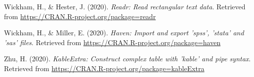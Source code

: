 \documentclass[
  english,
  doc,floatsintext]{apa6}
\newlength{\cslhangindent}
\newenvironment{cslreferences}%
  {\setlength{\parindent}{0pt}%
  \everypar{\setlength{\hangindent}{\cslhangindent}}\ignorespaces}%
  {\par}
\begin{document}
\begin{cslreferences}
\leavevmode\hypertarget{ref-R-readr}{}%
Wickham, H., \& Hester, J. (2020). \emph{Readr: Read rectangular text data}. Retrieved from \url{https://CRAN.R-project.org/package=readr}

\leavevmode\hypertarget{ref-R-haven}{}%
Wickham, H., \& Miller, E. (2020). \emph{Haven: Import and export 'spss', 'stata' and 'sas' files}. Retrieved from \url{https://CRAN.R-project.org/package=haven}

\leavevmode\hypertarget{ref-R-kableExtra}{}%
Zhu, H. (2020). \emph{KableExtra: Construct complex table with 'kable' and pipe syntax}. Retrieved from \url{https://CRAN.R-project.org/package=kableExtra}
\end{cslreferences}

\endgroup
\end{document}

